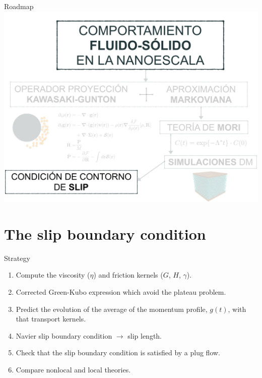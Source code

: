 \documentclass{beamer}
\begin{document}
\begin{frame}{Roadmap}
  \includegraphics[width=\linewidth]{scheme-thesis-slip}
\end{frame}

\section{The slip boundary condition}
\begin{frame}{Strategy}
  \begin{enumerate}
    \item Compute the viscosity ($\eta$) and friction kernels ($G$, $H$, $\gamma$).
    \item Corrected Green-Kubo expression which avoid the plateau problem. 
    \item Predict the evolution of the average of the momentum profile, $g(t)$, with that transport kernels. 
    \item Navier slip boundary condition $\rightarrow$ slip length. 
    \item Check that the slip boundary condition is satisfied by a plug flow.
    \item Compare nonlocal and local theories. 
  \end{enumerate}
\end{frame}
\end{document}
